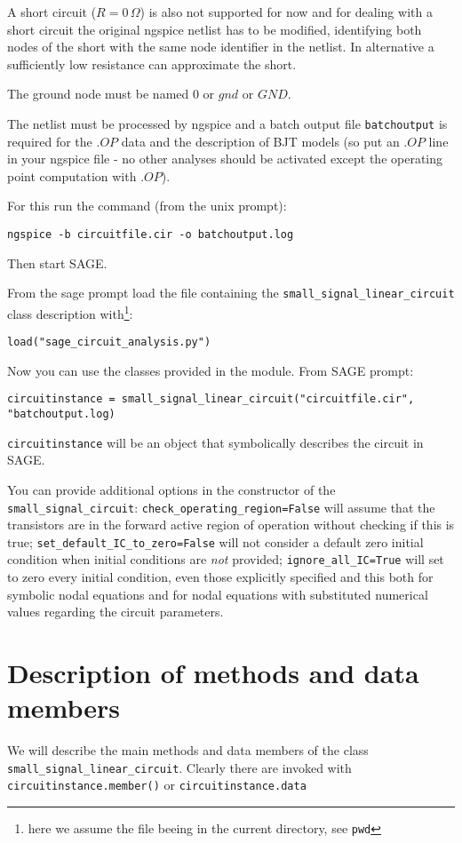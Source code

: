 \documentclass[a4paper]{article}
\begin{document}
A short circuit ($R=0\,\Omega$) is also not supported for now and for dealing with a short circuit the original ngspice netlist has to be modified, identifying both nodes of the short with the same node identifier in the netlist. In alternative a sufficiently low resistance can approximate the short.

The ground node must be named $0$ or $gnd$ or $GND$.

The netlist must be processed by ngspice and a batch output file {\tt batchoutput} is required for the $.OP$ data and the description of BJT models (so put an $.OP$ line in your ngspice file - no other analyses should be activated except the operating point computation with $.OP$). 

For this run the command (from the unix prompt):
\begin{verbatim}
ngspice -b circuitfile.cir -o batchoutput.log
\end{verbatim}

Then start SAGE.

From the sage prompt load the file containing the {\tt small\_signal\_linear\_circuit} class description with\footnote{here we assume the file beeing in the current directory, see {\tt pwd}}:
\begin{verbatim}
load("sage_circuit_analysis.py")
\end{verbatim}
Now you can use the classes provided in the module. From SAGE prompt:
\begin{verbatim}
circuitinstance = small_signal_linear_circuit("circuitfile.cir", "batchoutput.log)
\end{verbatim}
{\tt circuitinstance} will be an object that symbolically describes the circuit in SAGE.

You can provide additional options in the constructor of the {\tt small\_signal\_circuit}: {\tt check\_operating\_region=False} will assume that the transistors are in the forward active region of operation without checking if this is true; {\tt set\_default\_IC\_to\_zero=False} will not consider a default zero initial condition when initial conditions are \emph{not} provided; {\tt ignore\_all\_IC=True} will set to zero every initial condition, even those explicitly specified and this both for symbolic nodal equations and for nodal equations with substituted numerical values regarding the circuit parameters.

\section{Description of methods and data members} 
We will describe the main methods and data members of the class {\tt small\_signal\_linear\_circuit}. Clearly there are invoked with {\tt circuitinstance.member()} or {\tt circuitinstance.data}\\
\end{document}
